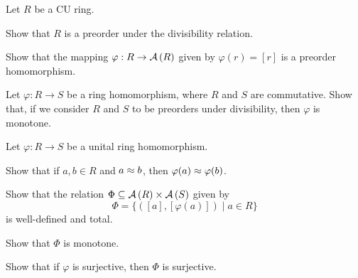 \begin{exercise}
Let \(R\) be a CU ring.
\begin{proplist*}
\item Show that \(R\) is a preorder under the divisibility relation.
\item Show that the mapping \(\varphi : R \rightarrow  \mathcal{A}\left(R\right) \) given by \(\varphi(r) = [r]\) is a preorder homomorphism.
\end{proplist*}
\end{exercise}

\begin{exercise}
Let \(\varphi : R \rightarrow S\) be a ring homomorphism, where \(R\) and \(S\) are commutative. Show that, if we consider \(R\) and \(S\) to be preorders under divisibility, then \(\varphi\) is monotone.
\end{exercise}

\begin{exercise}
Let \(\varphi : R \rightarrow S\) be a unital ring homomorphism.
\begin{proplist}
\item Show that if \(a,b \in R\) and \(a \approx b\), then \(\varphi(a) \approx \varphi(b)\).
\item Show that the relation \( \Phi \subseteq  \mathcal{A}\left(R\right)  \times  \mathcal{A}\left(S\right)  \) given by \[ \Phi = \{ ([a],[\varphi(a)]) \mid a \in R \} \] is well-defined and total.
\item Show that \(\Phi\) is monotone.
\item Show that if \(\varphi\) is surjective, then \(\Phi\) is surjective.
\end{proplist}
\end{exercise}
